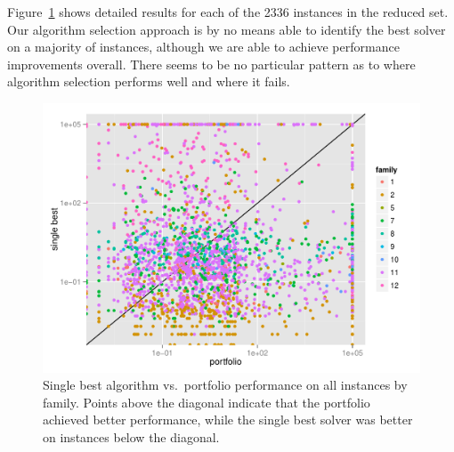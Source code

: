 \documentclass{llncs}
\begin{document}
Figure~\ref{fig:scatter} shows detailed results for each of the 2336 instances
in the reduced set. Our algorithm selection approach is by no means able to
identify the best solver on a majority of instances, although we are able to
achieve performance improvements overall. There seems to be no particular
pattern as to where algorithm selection performs well and where it fails.

\begin{figure}[!ht]
\includegraphics[width=\textwidth]{figures/perfScatter}
\caption{Single best algorithm vs.\ portfolio performance on all instances by
family. Points above the diagonal indicate that the portfolio achieved better
performance, while the single best solver was better on instances below the
diagonal.}
\label{fig:scatter}
\end{figure}
\end{document}
